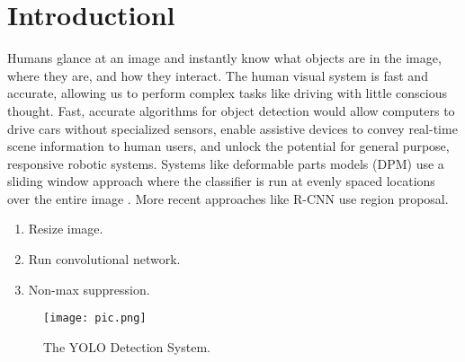 \documentclass[12pt,a4paper]{article}
\begin{document}




\tableofcontents
 \newpage
\section{Introductionl}

Humans glance at an image and instantly know what objects are in the image, where they are, and how they interact. The human visual system is fast and accurate, allowing us to perform complex tasks like driving with little conscious thought. Fast, accurate algorithms for object detection would allow computers to drive cars without specialized sensors, enable assistive devices to convey real-time scene information to human users, and unlock the potential for general purpose, responsive robotic systems. Systems like deformable parts models (DPM) use a sliding window approach where the classifier is run at evenly spaced locations over the entire image . More recent approaches like R-CNN use region proposal.

\begin{enumerate}
\item Resize image.
\item Run convolutional network. 
\item Non-max suppression. 
\end{enumerate}

\begin{figure}[!ht]

\centering
\texttt{[image: pic.png]}
\caption{\label{pic.png}The YOLO Detection System.}
\end{figure}
\end{document}
